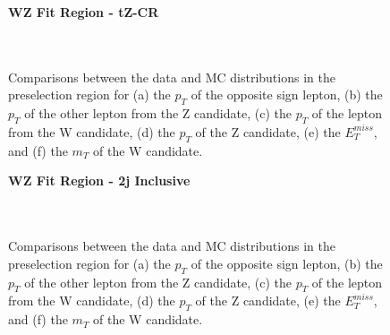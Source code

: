 \begin{figure}[H] 
    \centering
    \textbf{WZ Fit Region - tZ-CR}\\
    \\
    \\
    \caption{Comparisons between the data and MC distributions in the preselection region for (a) the $p_T$ of the opposite sign lepton, (b) the $p_T$ of the other lepton from the Z candidate, (c) the $p_T$ of the lepton from the W candidate, (d) the $p_T$ of the Z candidate, (e) the $E_T^{miss}$, and (f) the $m_T$ of the W candidate.}
    \label{kin:tZ_CR_1j}
\end{figure}

\begin{figure}[H] 
    \centering
    \textbf{WZ Fit Region - 2j Inclusive}\\                                                                                
    \\                   
    \\                  
    \caption{Comparisons between the data and MC distributions in the preselection region for (a) the $p_T$ of the opposite sign lepton, (b) the $p_T$ of the other lepton from the Z candidate, (c) the $p_T$ of the lepton from the W candidate, (d) the $p_T$ of the Z candidate, (e) the $E_T^{miss}$, and (f) the $m_T$ of the W candidate.}
    \label{kin:WP_2j_inc}
\end{figure}

